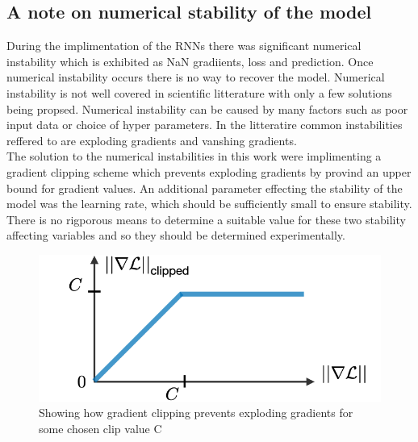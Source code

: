 \documentclass{article}
\begin{document}
\subsection{A note on numerical stability of the model}
During the implimentation of the RNNs there was significant numerical instability which is exhibited as NaN gradiients, loss and prediction. Once numerical instability occurs there is no way to recover the model. Numerical instability is not well covered in scientific litterature with only a few solutions being propsed. Numerical instability can be caused by many factors such as poor input data or choice of hyper parameters. In the litteratire common instabilities reffered to are exploding gradients and vanshing gradients. \\
The solution to the numerical instabilities in this work were implimenting a gradient clipping scheme which prevents exploding gradients by provind an upper bound for gradient values. An additional parameter effecting the stability of the model was the learning rate, which should be sufficiently small to ensure stability. There is no rigporous means to determine a suitable value for these two stability affecting variables and so they should be determined experimentally. 
\begin{figure}[H]
\caption{Showing how gradient clipping prevents exploding gradients for some chosen clip value C}
\includegraphics[scale=0.35]{gradient_clipping.png}
\end{figure}
\end{document}
